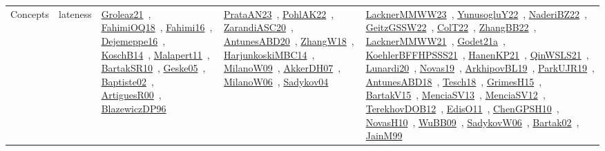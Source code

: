 {\begin{longtable}{lp{3cm}>{\raggedright\arraybackslash}p{6cm}>{\raggedright\arraybackslash}p{6cm}>{\raggedright\arraybackslash}p{8cm}}
Concepts & lateness & \href{../works/Groleaz21.pdf}{Groleaz21}~\cite{Groleaz21}, \href{../works/FahimiOQ18.pdf}{FahimiOQ18}~\cite{FahimiOQ18}, \href{../works/Fahimi16.pdf}{Fahimi16}~\cite{Fahimi16}, \href{../works/Dejemeppe16.pdf}{Dejemeppe16}~\cite{Dejemeppe16}, \href{../works/KoschB14.pdf}{KoschB14}~\cite{KoschB14}, \href{../works/Malapert11.pdf}{Malapert11}~\cite{Malapert11}, \href{../works/BartakSR10.pdf}{BartakSR10}~\cite{BartakSR10}, \href{../works/Geske05.pdf}{Geske05}~\cite{Geske05}, \href{../works/Baptiste02.pdf}{Baptiste02}~\cite{Baptiste02}, \href{../works/ArtiguesR00.pdf}{ArtiguesR00}~\cite{ArtiguesR00}, \href{../works/BlazewiczDP96.pdf}{BlazewiczDP96}~\cite{BlazewiczDP96} & \href{../works/PrataAN23.pdf}{PrataAN23}~\cite{PrataAN23}, \href{../works/PohlAK22.pdf}{PohlAK22}~\cite{PohlAK22}, \href{../works/ZarandiASC20.pdf}{ZarandiASC20}~\cite{ZarandiASC20}, \href{../works/AntunesABD20.pdf}{AntunesABD20}~\cite{AntunesABD20}, \href{../works/ZhangW18.pdf}{ZhangW18}~\cite{ZhangW18}, \href{../works/HarjunkoskiMBC14.pdf}{HarjunkoskiMBC14}~\cite{HarjunkoskiMBC14}, \href{../works/MilanoW09.pdf}{MilanoW09}~\cite{MilanoW09}, \href{../works/AkkerDH07.pdf}{AkkerDH07}~\cite{AkkerDH07}, \href{../works/MilanoW06.pdf}{MilanoW06}~\cite{MilanoW06}, \href{../works/Sadykov04.pdf}{Sadykov04}~\cite{Sadykov04} & \href{../works/LacknerMMWW23.pdf}{LacknerMMWW23}~\cite{LacknerMMWW23}, \href{../works/YunusogluY22.pdf}{YunusogluY22}~\cite{YunusogluY22}, \href{../works/NaderiBZ22.pdf}{NaderiBZ22}~\cite{NaderiBZ22}, \href{../works/GeitzGSSW22.pdf}{GeitzGSSW22}~\cite{GeitzGSSW22}, \href{../works/ColT22.pdf}{ColT22}~\cite{ColT22}, \href{../works/ZhangBB22.pdf}{ZhangBB22}~\cite{ZhangBB22}, \href{../works/LacknerMMWW21.pdf}{LacknerMMWW21}~\cite{LacknerMMWW21}, \href{../works/Godet21a.pdf}{Godet21a}~\cite{Godet21a}, \href{../works/KoehlerBFFHPSSS21.pdf}{KoehlerBFFHPSSS21}~\cite{KoehlerBFFHPSSS21}, \href{../works/HanenKP21.pdf}{HanenKP21}~\cite{HanenKP21}, \href{../works/QinWSLS21.pdf}{QinWSLS21}~\cite{QinWSLS21}, \href{../works/Lunardi20.pdf}{Lunardi20}~\cite{Lunardi20}, \href{../works/Novas19.pdf}{Novas19}~\cite{Novas19}, \href{../works/ArkhipovBL19.pdf}{ArkhipovBL19}~\cite{ArkhipovBL19}, \href{../works/ParkUJR19.pdf}{ParkUJR19}~\cite{ParkUJR19}, \href{../works/AntunesABD18.pdf}{AntunesABD18}~\cite{AntunesABD18}, \href{../works/Tesch18.pdf}{Tesch18}~\cite{Tesch18}, \href{../works/GrimesH15.pdf}{GrimesH15}~\cite{GrimesH15}, \href{../works/BartakV15.pdf}{BartakV15}~\cite{BartakV15}, \href{../works/MenciaSV13.pdf}{MenciaSV13}~\cite{MenciaSV13}, \href{../works/MenciaSV12.pdf}{MenciaSV12}~\cite{MenciaSV12}, \href{../works/TerekhovDOB12.pdf}{TerekhovDOB12}~\cite{TerekhovDOB12}, \href{../works/EdisO11.pdf}{EdisO11}~\cite{EdisO11}, \href{../works/ChenGPSH10.pdf}{ChenGPSH10}~\cite{ChenGPSH10}, \href{../works/NovasH10.pdf}{NovasH10}~\cite{NovasH10}, \href{../works/WuBB09.pdf}{WuBB09}~\cite{WuBB09}, \href{../works/SadykovW06.pdf}{SadykovW06}~\cite{SadykovW06}, \href{../works/Bartak02.pdf}{Bartak02}~\cite{Bartak02}, \href{../works/JainM99.pdf}{JainM99}~\cite{JainM99}\\

\end{longtable}}

